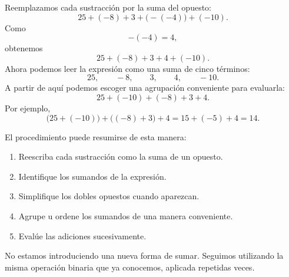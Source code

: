 Reemplazamos cada sustracción por la suma del opuesto:
\[
25+(-8)+3+\bigl(-(-4)\bigr)+(-10).
\]
Como
\[
-(-4)=4,
\]
obtenemos
\[
25+(-8)+3+4+(-10).
\]
Ahora podemos leer la expresión como una suma de cinco términos:
\[
25,\qquad-8,\qquad3,\qquad4,\qquad-10.
\]
A partir de aquí podemos escoger una agrupación conveniente para evaluarla:
\[
25+(-10)+(-8)+3+4.
\]
Por ejemplo,
\[
\bigl(25+(-10)\bigr)+\bigl((-8)+3\bigr)+4
=
15+(-5)+4
=
14.
\]

El procedimiento puede resumirse de esta manera:
\begin{enumerate}
\item Reescriba cada sustracción como la suma de un opuesto.
\item Identifique los sumandos de la expresión.
\item Simplifique los dobles opuestos cuando aparezcan.
\item Agrupe u ordene los sumandos de una manera conveniente.
\item Evalúe las adiciones sucesivamente.
\end{enumerate}

No estamos introduciendo una nueva forma de sumar. Seguimos utilizando la misma operación binaria que ya conocemos, aplicada repetidas veces.
